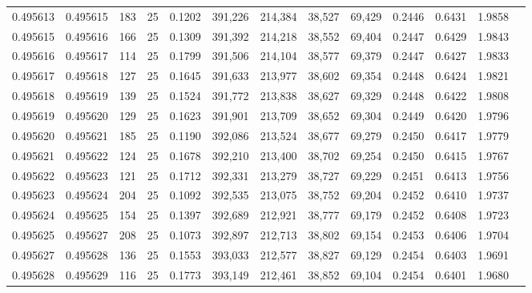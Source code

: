 \begin{tabular}{rrrrrrrrrrrrr}
0.495613 & 0.495615 &   183 &  25 &                                     0.1202 & 391,226 & 214,384 &  38,527 &  69,429 & 0.2446 & 0.6431 & 1.9858 \\
0.495615 & 0.495616 &   166 &  25 &                                     0.1309 & 391,392 & 214,218 &  38,552 &  69,404 & 0.2447 & 0.6429 & 1.9843 \\
0.495616 & 0.495617 &   114 &  25 &                                     0.1799 & 391,506 & 214,104 &  38,577 &  69,379 & 0.2447 & 0.6427 & 1.9833 \\
0.495617 & 0.495618 &   127 &  25 &                                     0.1645 & 391,633 & 213,977 &  38,602 &  69,354 & 0.2448 & 0.6424 & 1.9821 \\
0.495618 & 0.495619 &   139 &  25 &                                     0.1524 & 391,772 & 213,838 &  38,627 &  69,329 & 0.2448 & 0.6422 & 1.9808 \\
0.495619 & 0.495620 &   129 &  25 &                                     0.1623 & 391,901 & 213,709 &  38,652 &  69,304 & 0.2449 & 0.6420 & 1.9796 \\
0.495620 & 0.495621 &   185 &  25 &                                     0.1190 & 392,086 & 213,524 &  38,677 &  69,279 & 0.2450 & 0.6417 & 1.9779 \\
0.495621 & 0.495622 &   124 &  25 &                                     0.1678 & 392,210 & 213,400 &  38,702 &  69,254 & 0.2450 & 0.6415 & 1.9767 \\
0.495622 & 0.495623 &   121 &  25 &                                     0.1712 & 392,331 & 213,279 &  38,727 &  69,229 & 0.2451 & 0.6413 & 1.9756 \\
0.495623 & 0.495624 &   204 &  25 &                                     0.1092 & 392,535 & 213,075 &  38,752 &  69,204 & 0.2452 & 0.6410 & 1.9737 \\
0.495624 & 0.495625 &   154 &  25 &                                     0.1397 & 392,689 & 212,921 &  38,777 &  69,179 & 0.2452 & 0.6408 & 1.9723 \\
0.495625 & 0.495627 &   208 &  25 &                                     0.1073 & 392,897 & 212,713 &  38,802 &  69,154 & 0.2453 & 0.6406 & 1.9704 \\
0.495627 & 0.495628 &   136 &  25 &                                     0.1553 & 393,033 & 212,577 &  38,827 &  69,129 & 0.2454 & 0.6403 & 1.9691 \\
0.495628 & 0.495629 &   116 &  25 &                                     0.1773 & 393,149 & 212,461 &  38,852 &  69,104 & 0.2454 & 0.6401 & 1.9680 \\

\end{tabular}
